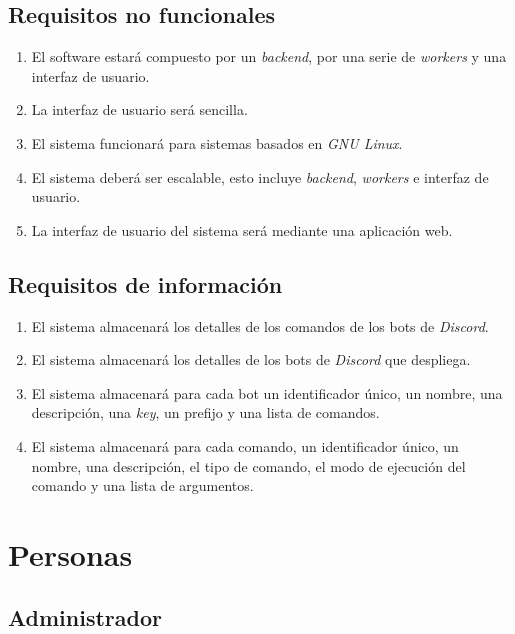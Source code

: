 \subsection{Requisitos no funcionales}

\begin{enumerate}
	\item El software estará compuesto por un \textit{backend}, por una serie de \textit{workers} y una interfaz de usuario.
	\item La interfaz de usuario será sencilla.
	\item El sistema funcionará para sistemas basados en \textit{GNU Linux}.
	\item El sistema deberá ser escalable, esto incluye \textit{backend}, \textit{workers} e interfaz de usuario.
	\item La interfaz de usuario del sistema será mediante una aplicación web.
\end{enumerate}

\subsection{Requisitos de información}

\begin{enumerate}
	\item El sistema almacenará los detalles de los comandos de los bots de \textit{Discord}.
	\item El sistema almacenará los detalles de los bots de \textit{Discord} que despliega.
	\item El sistema almacenará para cada bot un identificador único, un nombre, una descripción, una \textit{key}, un prefijo y una lista de comandos.
	\item El sistema almacenará para cada comando, un identificador único, un nombre, una descripción, el tipo de comando, el modo de ejecución del comando y una lista de argumentos.
\end{enumerate}


\section{Personas}

\subsection{Administrador}
\label{sec:personaAdmin}

